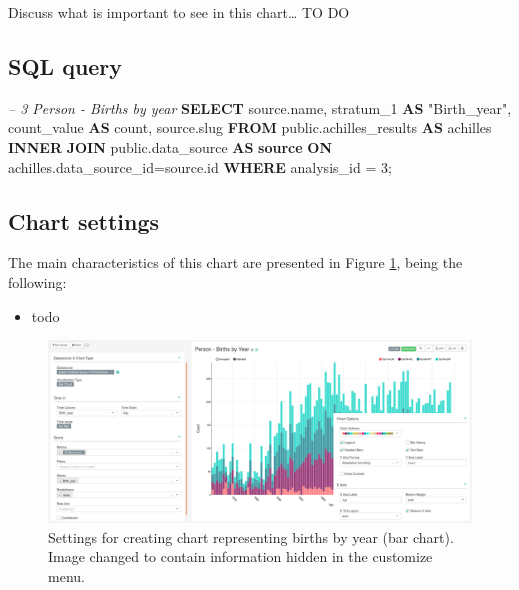 \documentclass[]{book}
\newenvironment{Shaded}{\begin{snugshade}}{\end{snugshade}}
\newcommand{\KeywordTok}[1]{\textcolor[rgb]{0.13,0.29,0.53}{\textbf{#1}}}
\newcommand{\DecValTok}[1]{\textcolor[rgb]{0.00,0.00,0.81}{#1}}
\newcommand{\CommentTok}[1]{\textcolor[rgb]{0.56,0.35,0.01}{\textit{#1}}}
\newcommand{\OtherTok}[1]{\textcolor[rgb]{0.56,0.35,0.01}{#1}}
\newcommand{\FunctionTok}[1]{\textcolor[rgb]{0.00,0.00,0.00}{#1}}
\newcommand{\NormalTok}[1]{#1}
\providecommand{\tightlist}{%
  \setlength{\itemsep}{0pt}\setlength{\parskip}{0pt}}
\begin{document}
Discuss what is important to see in this chart\ldots{} TO DO

\subsection{SQL query}\label{sql-query-8}

\begin{Shaded}
\begin{Highlighting}[]
\CommentTok{-- 3  Person - Births by year}
\KeywordTok{SELECT}\NormalTok{ source.name,}
\NormalTok{       stratum_1 }\KeywordTok{AS} \OtherTok{"Birth_year"}\NormalTok{,}
\NormalTok{       count_value }\KeywordTok{AS} \FunctionTok{count}\NormalTok{, }
\NormalTok{       source.slug}
\KeywordTok{FROM}\NormalTok{ public.achilles_results }\KeywordTok{AS}\NormalTok{ achilles }\KeywordTok{INNER} \KeywordTok{JOIN} 
\NormalTok{    public.data_source }\KeywordTok{AS} \KeywordTok{source} \KeywordTok{ON}\NormalTok{ achilles.data_source_id=source.id}
\KeywordTok{WHERE}\NormalTok{ analysis_id = }\DecValTok{3}\NormalTok{;}
\end{Highlighting}
\end{Shaded}

\subsection{Chart settings}\label{chart-settings-8}

The main characteristics of this chart are presented in Figure
\ref{fig:personBirthsByYear}, being the following:

\begin{itemize}
\tightlist
\item
  todo
\end{itemize}

\begin{figure}
\includegraphics[width=1\linewidth]{images/personBirthsByYear} \caption{Settings for creating chart representing births by year (bar chart). Image changed to contain information hidden in the customize menu.}\label{fig:personBirthsByYear}
\end{figure}
\end{document}
